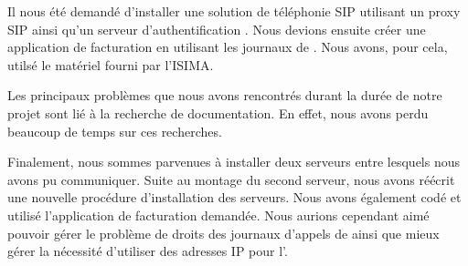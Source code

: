 
Il nous été demandé d'installer une solution de téléphonie SIP utilisant un proxy SIP {\kam} ainsi qu'un serveur d'authentification {\rad} {\frad}. Nous devions ensuite créer une application de facturation en utilisant les journaux de {\frad}. Nous avons, pour cela, utilsé le matériel fourni par l'ISIMA.  

Les principaux problèmes que nous avons rencontrés durant la durée de notre projet sont lié à la recherche de documentation. En effet, nous avons perdu beaucoup de temps sur ces recherches. 

Finalement, nous sommes parvenues à installer deux serveurs entre lesquels nous avons pu communiquer. Suite au montage du second serveur, nous avons réécrit une nouvelle procédure d'installation des serveurs.  
Nous avons également codé et utilisé l'application de facturation demandée.
Nous aurions cependant aimé pouvoir gérer le problème de droits des journaux d'appels de {\frad} ainsi que mieux gérer la nécessité d'utiliser des adresses IP pour l'{\ata}.

